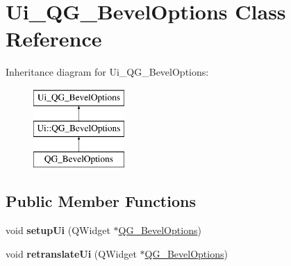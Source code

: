 \hypertarget{classUi__QG__BevelOptions}{\section{Ui\-\_\-\-Q\-G\-\_\-\-Bevel\-Options Class Reference}
\label{classUi__QG__BevelOptions}
}
Inheritance diagram for Ui\-\_\-\-Q\-G\-\_\-\-Bevel\-Options\-:\begin{figure}[H]
\begin{center}
\leavevmode
\includegraphics[height=3.000000cm]{classUi__QG__BevelOptions}
\end{center}
\end{figure}
\subsection*{Public Member Functions}
\begin{DoxyCompactItemize}
\item 
\hypertarget{classUi__QG__BevelOptions_ad7322806c218eee3928f32103e882b4b}{void {\bfseries setup\-Ui} (Q\-Widget $\ast$\hyperlink{classQG__BevelOptions}{Q\-G\-\_\-\-Bevel\-Options})}\label{classUi__QG__BevelOptions_ad7322806c218eee3928f32103e882b4b}

\item 
\hypertarget{classUi__QG__BevelOptions_a1762688d92cf216d0eaa41c6b7144a68}{void {\bfseries retranslate\-Ui} (Q\-Widget $\ast$\hyperlink{classQG__BevelOptions}{Q\-G\-\_\-\-Bevel\-Options})}\label{classUi__QG__BevelOptions_a1762688d92cf216d0eaa41c6b7144a68}

\end{DoxyCompactItemize}
